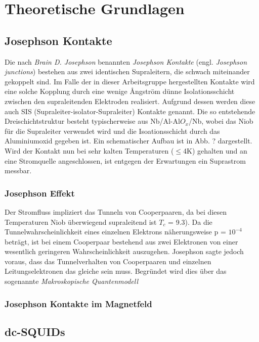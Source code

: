 \chapter{Theoretische Grundlagen}


\section{Josephson Kontakte}
Die nach \textit{Brain D. Josephson} benannten \textit{Josephson Kontakte} (engl. \textit{Josephson junctions}) bestehen aus zwei identischen Supraleitern, die schwach miteinander gekoppelt sind. Im Falle der in dieser Arbeitsgruppe hergestellten Kontakte wird eine solche Kopplung durch eine wenige \r{A}ngström dünne Isolationsschicht zwischen den supraleitenden Elektroden realisiert. Aufgrund dessen werden diese auch SIS (Supraleiter-isolator-Supraleiter) Kontakte genannt. Die so entstehende Dreischichtstruktur besteht typischerweise aus Nb/Al-Al$O_x$/Nb, wobei das Niob für die Supraleiter verwendet wird und die Isoationsschicht durch das Aluminiumoxid gegeben ist. Ein schematischer Aufbau ist in Abb. ? dargestellt. 
Wird der Kontakt nun bei sehr kalten Temperaturen ($\leq$4K) gehalten und an eine Stromquelle angeschlossen, ist entgegen der Erwartungen ein Suprastrom messbar.
        
\subsection{Josephson Effekt}

Der Stromfluss impliziert das Tunneln von Cooperpaaren, da bei diesen Temperaturen Niob überwiegend supraleitend ist  \texttt{${T_c}$} = 9.3). Da die Tunnelwahrscheinlichkeit eines einzelnen Elektrons näherungsweise p = $10^{-4}$ beträgt, ist bei einem Cooperpaar bestehend aus zwei Elektronen von einer wesentlich geringeren Wahrscheinlichkeit auszugehen. Josephson sagte jedoch voraus, dass das Tunnelverhalten von Cooperpaaren und einzelnen Leitungselektronen das gleiche sein muss. Begründet wird dies über das sogenannte \textit{Makroskopische Quantenmodell} 

\subsection{Josephson Kontakte im Magnetfeld}

\Blindtext

\section{dc-SQUIDs}

